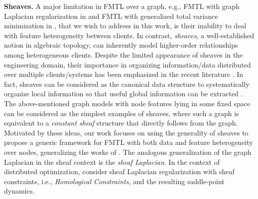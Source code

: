 \textbf{Sheaves.}
A major limitation in FMTL over a graph, e.g., FMTL with graph Laplacian regularization in \citep{dinh2022new} and FMTL with generalized total variance minimization in \citep{sarcheshmehpour2023networked}, that we wish to address in this work, is their inability to deal with feature heterogeneity between clients. In contrast, \textit{sheaves}, a well-established notion in algebraic topology, can inherently model higher-order relationships among heterogeneous clients. Despite the limited appearance of sheaves in the engineering domain, their importance in organizing information/data distributed over multiple clients/systems has been emphasized in the recent literature \citep{robinson2014topological, robinson2013understanding, riess2022diffusion}. In fact, sheaves can be considered as the canonical data structure to systematically organize local information so that useful global information can be extracted \citep{robinson2017sheaves}. The above-mentioned graph models with node features lying in some fixed space can be considered as the simplest examples of sheaves, where such a graph is equivalent to a \textit{constant sheaf} structure that directly follows from the graph. Motivated by these ideas, our work focuses on using the generality of sheaves to propose a generic framework for FMTL with both data and feature heterogeneity over nodes, generalizing the works of \citep{dinh2022new, sarcheshmehpour2023networked}. The analogous generalization of the graph Laplacian in the sheaf context is the \textit{sheaf Laplacian}. In the context of distributed optimization, \citep{hansen2019distributed} consider sheaf Laplacian regularization with sheaf constraints, i.e., \textit{Homological Constraints}, and the resulting saddle-point dynamics.